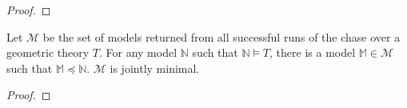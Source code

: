 		\begin{proof}
			
		\end{proof}

		\begin{theorem}
			Let $\mathcal{M}$ be the set of models returned from all successful
			runs of the chase over a geometric theory $T$. For any model
			$\mathbb{N}$ such that $\mathbb{N} \models T$, there is a model
			$\mathbb{M} \in \mathcal{M}$ such that $\mathbb{M} \preceq
			\mathbb{N}$. $\mathcal{M}$ is jointly minimal.
		\end{theorem}

		\begin{proof}
			
		\end{proof}


